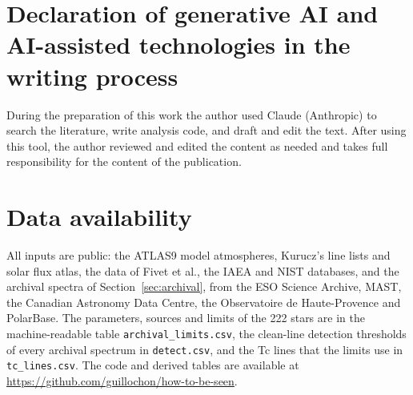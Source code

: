 \documentclass[final,5p]{elsarticle}
\begin{document}
\section*{Declaration of generative AI and AI-assisted technologies in the writing process}
During the preparation of this work the author used Claude (Anthropic) to search the literature, write analysis code, and draft and edit the text. After using this tool, the author reviewed and edited the content as needed and takes full responsibility for the content of the publication.

\section*{Data availability}
All inputs are public: the ATLAS9 model atmospheres, Kurucz's line lists and solar flux atlas, the  data of Fivet et al., the IAEA and NIST databases, and the archival spectra of Section~\ref{sec:archival}, from the ESO Science Archive, MAST, the Canadian Astronomy Data Centre, the Observatoire de Haute-Provence and PolarBase. The parameters, sources and limits of the 222 stars are in the machine-readable table \texttt{archival\_limits.csv}, the clean-line detection thresholds of every archival spectrum in \texttt{detect.csv}, and the Tc lines that the limits use in \texttt{tc\_lines.csv}. The code and derived tables are available at \url{https://github.com/guillochon/how-to-be-seen}.



\end{document}
